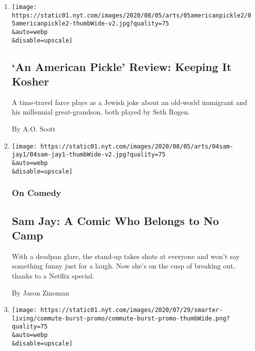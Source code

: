 \begin{enumerate}
\def\labelenumi{\arabic{enumi}.}
\item
  \href{/2020/08/04/movies/an-american-pickle-review.html}{}

  \texttt{[image: https://static01.nyt.com/images/2020/08/05/arts/05americanpickle2/05americanpickle2-thumbWide-v2.jpg?quality=75\\\&auto=webp\\\&disable=upscale]}

  \hypertarget{an-american-pickle-review-keeping-it-kosher}{%
  \subsection{`An American Pickle' Review: Keeping It
  Kosher}\label{an-american-pickle-review-keeping-it-kosher}}

  A time-travel farce plays as a Jewish joke about an old-world
  immigrant and his millennial great-grandson, both played by Seth
  Rogen.

  By A.O. Scott
\item
  \href{/2020/08/04/arts/television/sam-jay-netflix-special.html}{}

  \texttt{[image: https://static01.nyt.com/images/2020/08/05/arts/04sam-jay1/04sam-jay1-thumbWide-v2.jpg?quality=75\\\&auto=webp\\\&disable=upscale]}

  \hypertarget{on-comedy}{%
  \subsubsection{On Comedy}\label{on-comedy}}

  \hypertarget{sam-jay-a-comic-who-belongs-to-no-camp}{%
  \subsection{Sam Jay: A Comic Who Belongs to No
  Camp}\label{sam-jay-a-comic-who-belongs-to-no-camp}}

  With a deadpan glare, the stand-up takes shots at everyone and won't
  say something funny just for a laugh. Now she's on the cusp of
  breaking out, thanks to a Netflix special.

  By Jason Zinoman
\item
  \href{/interactive/2020/08/03/burst/reclaim-commute-time.html}{}

  \texttt{[image: https://static01.nyt.com/images/2020/07/29/smarter-living/commute-burst-promo/commute-burst-promo-thumbWide.png?quality=75\\\&auto=webp\\\&disable=upscale]}


\end{enumerate}
